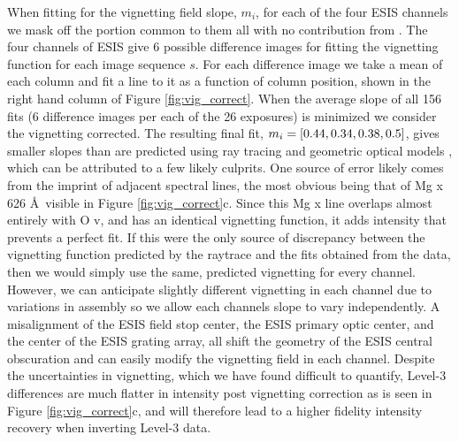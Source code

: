         When fitting for the vignetting field slope, $m_i$, for each  of the four ESIS channels we mask off the portion common to them all with no contribution from \mgxbright.
        The four channels of ESIS give 6 possible difference images for fitting the vignetting function for each image sequence $s$. 
        For each difference image we take a mean of each column and fit a line to it as a function of column position, shown in the right hand column of Figure \ref{fig:vig_correct}.
        When the average slope of all 156 fits (6 difference images per each of the 26 exposures) 
        is minimized we consider the vignetting corrected. 
        The resulting final fit, $m_i = [0.44, 0.34, 0.38, 0.5]$, gives smaller slopes than are predicted using ray tracing and geometric optical models \citep{ESIS}, which can be attributed to a few likely culprits. 
        One source of error likely comes from the imprint of adjacent spectral lines, the most obvious being that of Mg {\sc x} 626 \AA \ visible in Figure \ref{fig:vig_correct}c.
        Since this Mg {\sc x} line overlaps almost entirely with O {\sc v}, and has an identical vignetting function, it adds intensity that prevents a perfect fit. 
        If this were the only source of discrepancy between the vignetting function predicted by the raytrace and the fits obtained from the data, then we would simply use the same, predicted vignetting for every channel. 
        However, we can anticipate slightly different vignetting in each channel due to variations in assembly so we allow each channels slope to vary independently.
        A misalignment of the ESIS field stop center, the ESIS primary optic center, and the center of the ESIS grating array, all shift the geometry of the ESIS central obscuration and can easily modify the vignetting field in each channel.
        Despite the uncertainties in vignetting, which we have found difficult to quantify, Level-3 differences are much flatter in intensity post vignetting correction as is seen in Figure \ref{fig:vig_correct}c, and will therefore lead to a higher fidelity intensity recovery when inverting Level-3 data.
        
